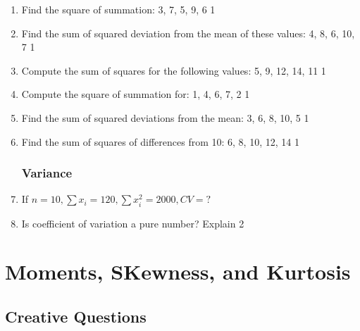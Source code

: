 \documentclass[a4paper,oneside]{book}
\begin{document}
\begin{enumerate}
\item Find the square of summation: 3, 7, 5, 9, 6 \hfill 1  

\item Find the sum of squared deviation from the mean of these values: 4, 8, 6, 10, 7 \hfill 1  

\item Compute the sum of squares for the following values: 5, 9, 12, 14, 11 \hfill 1  

\item Compute the square of summation for: 1, 4, 6, 7, 2 \hfill 1  

\item Find the sum of squared deviations from the mean: 3, 6, 8, 10, 5 \hfill 1  

\item Find the sum of squares of differences from 10: 6, 8, 10, 12, 14 \hfill 1  



\subsection{Variance}
\item If $n=10, \sum x_i = 120, \sum x_i^2=2000, CV=?$
\item Is coefficient of variation a pure number? Explain \hfill 2

\end{enumerate}


\chapter{Moments, SKewness, and Kurtosis} 
\section{Creative Questions}
\end{document}
